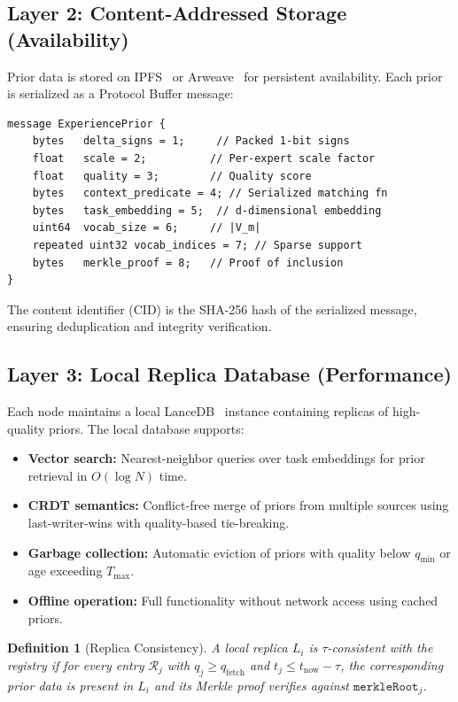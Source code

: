 \documentclass[11pt]{article}
\newtheorem{definition}{Definition}
\begin{document}
\subsection{Layer 2: Content-Addressed Storage (Availability)}

Prior data is stored on IPFS~\cite{benet2014ipfs} or
Arweave~\cite{williams2019arweave} for persistent availability. Each prior is
serialized as a Protocol Buffer message:

\begin{verbatim}
message ExperiencePrior {
    bytes   delta_signs = 1;     // Packed 1-bit signs
    float   scale = 2;          // Per-expert scale factor
    float   quality = 3;        // Quality score
    bytes   context_predicate = 4; // Serialized matching fn
    bytes   task_embedding = 5;  // d-dimensional embedding
    uint64  vocab_size = 6;     // |V_m|
    repeated uint32 vocab_indices = 7; // Sparse support
    bytes   merkle_proof = 8;   // Proof of inclusion
}
\end{verbatim}

The content identifier (CID) is the SHA-256 hash of the serialized message,
ensuring deduplication and integrity verification.

\subsection{Layer 3: Local Replica Database (Performance)}

Each node maintains a local LanceDB~\cite{lancedb2024} instance containing
replicas of high-quality priors. The local database supports:

\begin{itemize}[leftmargin=1.5em]
    \item \textbf{Vector search:} Nearest-neighbor queries over task embeddings
          for prior retrieval in $O(\log N)$ time.
    \item \textbf{CRDT semantics:} Conflict-free merge of priors from multiple
          sources using last-writer-wins with quality-based tie-breaking.
    \item \textbf{Garbage collection:} Automatic eviction of priors with quality
          below $q_{\min}$ or age exceeding $T_{\max}$.
    \item \textbf{Offline operation:} Full functionality without network access
          using cached priors.
\end{itemize}

\begin{definition}[Replica Consistency]
A local replica $L_i$ is \emph{$\tau$-consistent} with the registry if for
every entry $\mathcal{R}_j$ with $q_j \geq q_{\text{fetch}}$ and
$t_j \leq t_{\text{now}} - \tau$, the corresponding prior data is present in
$L_i$ and its Merkle proof verifies against $\texttt{merkleRoot}_j$.
\end{definition}
\end{document}

